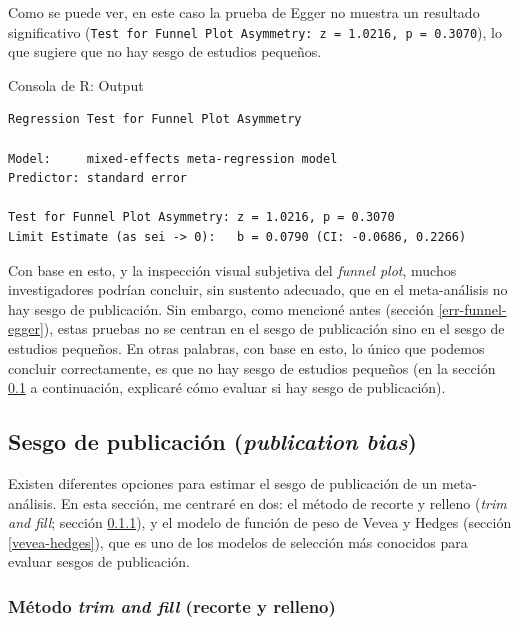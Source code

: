 \documentclass[
  bookmarksnumbered]{article}
\begin{document}
Como se puede ver, en este caso la prueba de Egger no muestra un resultado significativo (\texttt{Test\ for\ Funnel\ Plot\ Asymmetry:\ z\ =\ 1.0216,\ p\ =\ 0.3070}), lo que sugiere que no hay sesgo de estudios pequeños.

\begin{ROut}{Consola de R: Output~\thetcbcounter}
                \begin{footnotesize}
                \begin{verbatim} 
Regression Test for Funnel Plot Asymmetry

Model:     mixed-effects meta-regression model
Predictor: standard error

Test for Funnel Plot Asymmetry: z = 1.0216, p = 0.3070
Limit Estimate (as sei -> 0):   b = 0.0790 (CI: -0.0686, 0.2266)
 \end{verbatim}
                \end{footnotesize}
                \end{ROut}

Con base en esto, y la inspección visual subjetiva del \emph{funnel plot}, muchos investigadores podrían concluir, sin sustento adecuado, que en el meta-análisis no hay sesgo de publicación. Sin embargo, como mencioné antes (sección \ref{err-funnel-egger}), estas pruebas no se centran en el sesgo de publicación sino en el sesgo de estudios pequeños. En otras palabras, con base en esto, lo único que podemos concluir correctamente, es que no hay sesgo de estudios pequeños (en la sección \ref{sesgo-pub} a continuación, explicaré cómo evaluar si hay sesgo de publicación).

\hypertarget{sesgo-pub}{%
\subsection{\texorpdfstring{Sesgo de publicación (\emph{publication bias})}{Sesgo de publicación (publication bias)}}\label{sesgo-pub}}

Existen diferentes opciones para estimar el sesgo de publicación de un meta-análisis. En esta sección, me centraré en dos: el método de recorte y relleno (\emph{trim and fill}; sección \ref{trim-fill}), y el modelo de función de peso de Vevea y Hedges (sección \ref{vevea-hedges}), que es uno de los modelos de selección más conocidos para evaluar sesgos de publicación.

\hypertarget{trim-fill}{%
\subsubsection{\texorpdfstring{Método \emph{trim and fill} (recorte y relleno)}{Método trim and fill (recorte y relleno)}}\label{trim-fill}}
\end{document}
